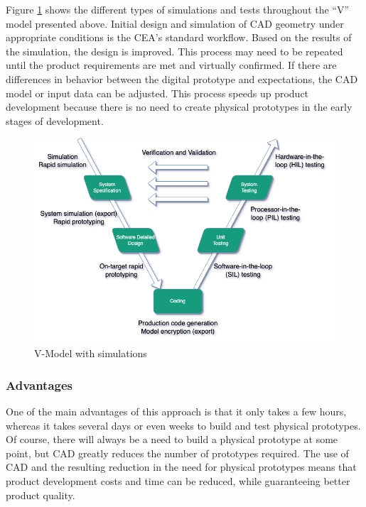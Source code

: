     Figure \ref{fig:v-model-sim} shows the different types of simulations and tests throughout the “V” model presented above. Initial design and simulation of CAD geometry under appropriate conditions is the CEA's standard workflow. Based on the results of the simulation, the design is improved. This process may need to be repeated until the product requirements are met and virtually confirmed. If there are differences in behavior between the digital prototype and expectations, the CAD model or input data can be adjusted. This process speeds up product development because there is no need to create physical prototypes in the early stages of development.

    \begin{figure}[h]
        \centering
        \includegraphics[scale=0.6]{images/Foundation-V-Model-Sim.drawio.png}
        \caption{\label{fig:v-model-sim} V-Model with simulations }
    \end{figure}


    \subsubsection{Advantages}
    One of the main advantages of this approach is that it only takes a few hours, whereas it takes several days or even weeks to build and test physical prototypes. Of course, there will always be a need to build a physical prototype at some point, but CAD greatly reduces the number of prototypes required. The use of CAD and the resulting reduction in the need for physical prototypes means that product development costs and time can be reduced, while guaranteeing better product quality.\\

